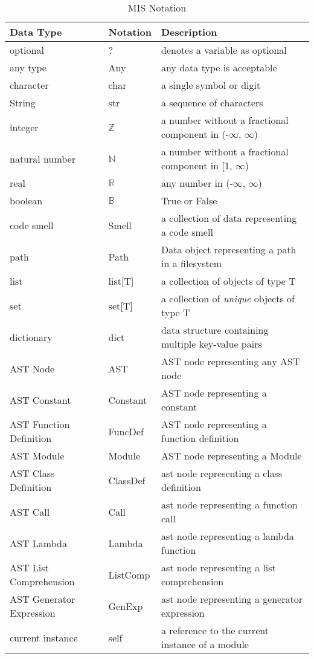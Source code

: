 \documentclass[12pt, titlepage]{article}
\begin{document}
\begin{table}
  \centering
  \renewcommand{\arraystretch}{1.2}
  \noindent 
  \begin{tabular}{l l p{7.5cm}} 
    \toprule 
    \textbf{Data Type} & \textbf{Notation} & \textbf{Description}\\ 
    \midrule
    optional & ? & denotes a variable as optional\\
    any type & Any & any data type is acceptable\\
    character & char & a single symbol or digit\\
    String & str & a sequence of characters\\
    integer & $\mathbb{Z}$ & a number without a fractional component in (-$\infty$, $\infty$) \\
    natural number & $\mathbb{N}$ & a number without a fractional component in [1, $\infty$) \\
    real & $\mathbb{R}$ & any number in (-$\infty$, $\infty$)\\
    boolean & $\mathbb{B}$ & True or False\\
    code smell & Smell & a collection of data representing a code smell\\
    path & Path & Data object representing a path in a filesystem\\
    list & list[T] & a collection of objects of type T\\
    set & set[T] & a collection of \textit{unique} objects of type T\\
    dictionary & dict & data structure containing multiple key-value pairs\\
    AST Node & AST & AST node representing any AST node\\
    AST Constant & Constant & AST node representing a constant\\
    AST Function Definition & FuncDef & AST node representing a function definition\\
    AST Module & Module & AST node representing a Module\\
    AST Class Definition & ClassDef & ast node representing a class definition\\
    AST Call & Call & ast node representing a function call\\
    AST Lambda & Lambda & ast node representing a lambda function\\
    AST List Comprehension & ListComp & ast node representing a list comprehension\\
    AST Generator Expression & GenExp & ast node representing a generator expression\\
    current instance & self & a reference to the current instance of a module\\
    \bottomrule
  \end{tabular}
  \label{tab:mis-notation}
  \caption{MIS Notation}
\end{table}
\end{document}
